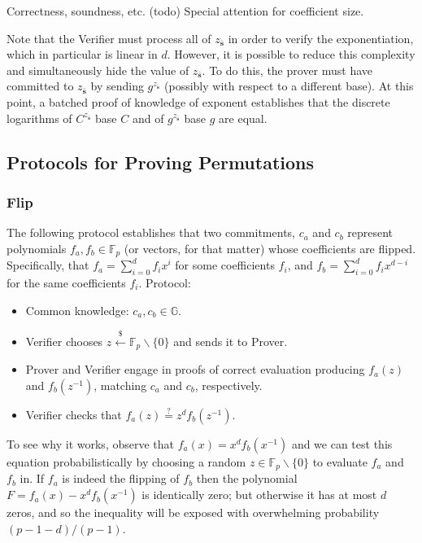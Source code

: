 \documentclass{article}
\begin{document}
Correctness, soundness, etc. (todo) Special attention for coefficient size.

Note that the Verifier must process all of $z_{\bar{\mathbf{s}}}$ in order to verify the exponentiation, which in particular is linear in $d$. However, it is possible to reduce this complexity and simultaneously hide the value of $z_{\bar{\mathbf{s}}}$. To do this, the prover must have committed to $z_{\bar{\mathbf{s}}}$ by sending $g^{z_{\bar{\mathbf{s}}}}$ (possibly with respect to a different base). At this point, a batched proof of knowledge of exponent establishes that the discrete logarithms of $C^{z_{\bar{\mathbf{s}}}}$ base $C$ and of $g^{z_{\bar{\mathbf{s}}}}$ base $g$ are equal.

\subsection{Protocols for Proving Permutations}


\subsubsection{Flip}

The following protocol establishes that two commitments, $c_a$ and $c_b$ represent polynomials $f_a, f_b \in \mathbb{F}_p$ (or vectors, for that matter) whose coefficients are flipped. Specifically, that $f_a = \sum_{i=0}^{d}f_i x^i$ for some coefficients $f_i$, and $f_b = \sum_{i=0}^df_ix^{d-i}$ for the same coefficients $f_i$.
Protocol:
\begin{itemize}
    \item Common knowledge: $c_a, c_b \in \mathbb{G}$.
    \item Verifier chooses $z \xleftarrow{\$} \mathbb{F}_p \backslash \{0\}$ and sends it to Prover.
    \item Prover and Verifier engage in proofs of correct evaluation producing $f_a(z)$ and $f_b(z^{-1})$, matching $c_a$ and $c_b$, respectively.
    \item Verifier checks that $f_a(z) \stackrel{?}{=} z^d f_b(z^{-1})$.
\end{itemize}

To see why it works, observe that $f_a(x) = x^df_b(x^{-1})$ and we can test this equation probabilistically by choosing a random $z \in \mathbb{F}_p \backslash \{0\}$ to evaluate $f_a$ and $f_b$ in. If $f_a$ is indeed the flipping of $f_b$ then the polynomial $F = f_a(x) - x^df_b(x^{-1})$ is identically zero; but otherwise it has at most $d$ zeros, and so the inequality will be exposed with overwhelming probability $(p-1-d)/(p-1)$.
\end{document}
